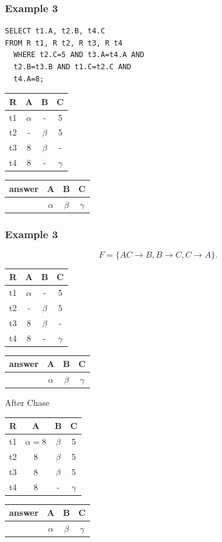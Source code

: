\documentclass{beamer}
\begin{document}
\begin{frame}[fragile]
  \frametitle{Example 3}
    \begin{verbatim}
SELECT t1.A, t2.B, t4.C
FROM R t1, R t2, R t3, R t4
  WHERE t2.C=5 AND t3.A=t4.A AND
  t2.B=t3.B AND t1.C=t2.C AND
  t4.A=8;
\end{verbatim}
  \begin{tabular}{ c | c c c}
  R & A & B & C \\
  \hline
  t1 & $\alpha$ & -  & 5 \\
  t2 & -  & $\beta$  & 5 \\
  t3 & 8  & $\beta$ & - \\
  t4 & 8  & - & $\gamma$ \\
  \end{tabular}
  \begin{tabular}{ c | c c c}
  answer & A & B & C \\
  \hline
   & $\alpha$& $\beta$& $\gamma$\\
  \end{tabular}
   
\end{frame}

\begin{frame}
  \frametitle{Example 3}
  $$
  F=\{AC\rightarrow B, B\rightarrow C, C \rightarrow A\}.
  $$
  
    \begin{tabular}{ c | c c c}
  R & A & B & C \\
  \hline
  t1 & $\alpha$ & -  & 5 \\
  t2 & -  & $\beta$  & 5 \\
  t3 & 8  & $\beta$ & - \\
  t4 & 8  & - & $\gamma$ \\
  \end{tabular}
  \begin{tabular}{ c | c c c}
  answer & A & B & C \\
  \hline
   & $\alpha$& $\beta$& $\gamma$\\
  \end{tabular}
  
  After Chase
  
  \begin{tabular}{ c | c c c}
  R & A & B & C \\
  \hline
  t1 & $\alpha=8$ & $\beta$  & 5 \\
  t2 & 8  & $\beta$  & 5 \\
  t3 & 8  & $\beta$ & 5 \\
  t4 & 8  & - & $\gamma$ \\
  \end{tabular}
  \begin{tabular}{ c | c c c}
  answer & A & B & C \\
  \hline
   & $\alpha$& $\beta$& $\gamma$\\
  \end{tabular}
\end{frame}
\end{document}
